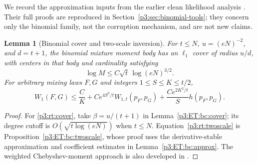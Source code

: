 \documentclass[11pt,a4paper]{article}
\newtheorem{lemma}[theorem]{Lemma}
\theoremstyle{definition}
\theoremstyle{remark}
\numberwithin{equation}{section}
\begin{document}
We record the approximation inputs from the earlier clean likelihood
analysis \cite[Parts VI--VIII]{p3:RT_Compiled2026}.  Their full proofs are
reproduced in Section~\ref{p3:sec:binomial-tools}; they concern only the
binomial family, not the corruption mechanism, and are not new claims.

\begin{lemma}[Binomial cover and two-scale inversion]\label{p3:rt:inputs}
For $t\le N$, $u=(eN)^{-2}$, and $d=t+1$, the binomial mixture moment
body has an $\ell_1$ cover of radius $u/d$, with centers in that body
and cardinality satisfying
\begin{equation}\label{p3:rt:cover}
                    \log M\le C\sqrt t\,\log(eN)^{3/2}.
\end{equation}
For arbitrary mixing laws $F,G$ and integers $1\le S\le K\le t/2$,
\begin{equation}\label{p3:rt:twoscale}
 W_1(F,G)\le\frac CK+
 Ce^{4S^2/t}W_{1,t}(p_F,p_G)+
                  \frac{Ce^{2K^2/t}}S h(p_F,p_G).
\end{equation}
\end{lemma}
\begin{proof}
For \eqref{p3:rt:cover}, take $\beta=u/(t+1)$ in
Lemma~\ref{p3:ET:bc:cover}; its degree cutoff is
$O(\sqrt{t\log(eN)})$ when $t\le N$.  Equation~\eqref{p3:rt:twoscale}
is Proposition~\ref{p3:ET:bc:twoscale}, whose proof uses the
derivative-stable approximation and coefficient estimates in
Lemma~\ref{p3:ET:bc:approx}.  The weighted Chebyshev-moment approach
is also developed in \cite{p3:RT_MMRS2025}.
\end{proof}
\end{document}
